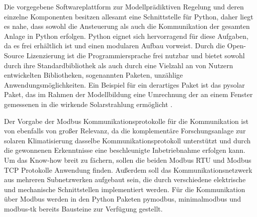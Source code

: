 
Die vorgegebene Softwareplattform zur Modellprädiktiven Regelung und deren einzelne Komponenten besitzen allesamt eine Schnittstelle für Python, daher liegt es nahe, dass sowohl die Ansteuerung als auch die Kommunikation der gesamten Anlage in Python erfolgen. Python eignet sich hervorragend für diese Aufgaben, da es frei erhältlich ist und einen modularen Aufbau vorweist. Durch die Open-Source Lizenzierung ist die Programmiersprache frei nutzbar und bietet sowohl durch ihre Standardbibliothek als auch durch eine Vielzahl an von Nutzern entwickelten Bibliotheken, sogenannten Paketen, unzählige Anwendungsmöglichkeiten. Ein Beispiel für ein derartiges Paket ist das pysolar Paket, das im Rahmen der Modellbildung eine Umrechnung der an einem Fenster gemessenen in die wirkende Solarstrahlung ermöglicht \cite[S.~2f.]{python}.

Der Vorgabe der Modbus Kommunikationsprotokolle für die Kommunikation ist von ebenfalls von großer Relevanz, da die komplementäre Forschungsanlage zur solaren Klimatisierung dasselbe Kommunikationsprotokoll unterstützt und durch die gewonnenen Erkenntnisse eine beschleunigte Inbetriebnahme erfolgen kann. Um das Know-how breit zu fächern, sollen die beiden Modbus RTU und Modbus TCP Protokolle Anwendung finden. Außerdem soll das Kommunikationsnetzwerk aus mehreren Subnetzwerken aufgebaut sein, die durch verschiedene elektrische und mechanische Schnittstellen implementiert werden. Für die Kommunikation über Modbus werden in den Python Paketen pymodbus, minimalmodbus und modbus-tk bereits Bausteine zur Verfügung gestellt.

